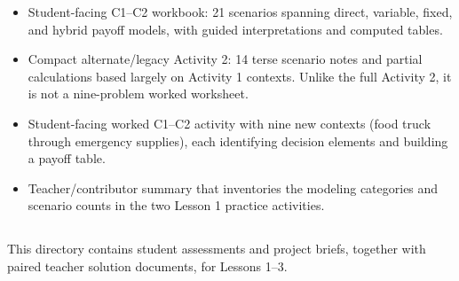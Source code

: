 \begin{itemize}
  \item {}

  Student-facing C1–C2 workbook: 21 scenarios spanning direct, variable, fixed, and hybrid payoff models, with guided interpretations and computed tables.

  \item {}

  Compact alternate/legacy Activity 2: 14 terse scenario notes and partial calculations based largely on Activity 1 contexts. Unlike the full Activity 2, it is not a nine-problem worked worksheet.

  \item {}

  Student-facing worked C1–C2 activity with nine new contexts (food truck through emergency supplies), each identifying decision elements and building a payoff table.

  \item {}

  Teacher/contributor summary that inventories the modeling categories and scenario counts in the two Lesson 1 practice activities.
\end{itemize}

\subsection{}

This directory contains student assessments and project briefs, together with paired teacher solution documents, for Lessons 1–3.

